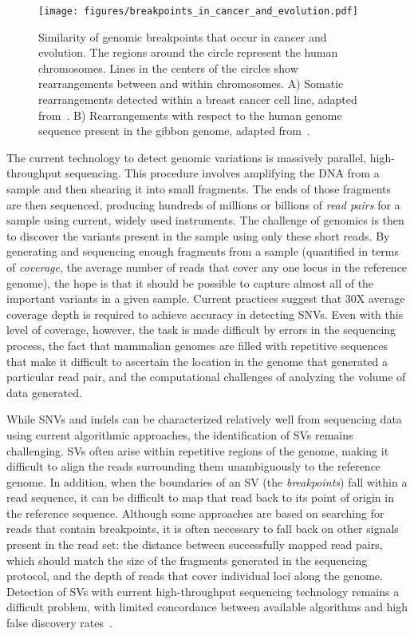 \begin{figure}
\centering
\texttt{[image: figures/breakpoints\_in\_cancer\_and\_evolution.pdf]}
\caption{Similarity of genomic breakpoints that occur in cancer and evolution. The regions around the circle represent the human chromosomes. Lines in the centers of the circles show rearrangements between and within chromosomes. A) Somatic rearrangements detected within a breast cancer cell line, adapted from~\cite{Hampton:2009fc}. B) Rearrangements with respect to the human genome sequence present in the gibbon genome, adapted from~\cite{Carbone:2009p1012}.}
\label{cancer_evolution_breakpoints}
\end{figure}

The current technology to detect genomic variations is massively parallel, high-throughput sequencing. This procedure involves amplifying the DNA from a sample and then shearing it into small fragments. The ends of those fragments are then sequenced, producing hundreds of millions or billions of \emph{read pairs} for a sample using current, widely used instruments. The challenge of genomics is then to discover the variants present in the sample using only these short reads. By generating and sequencing enough fragments from a sample (quantified in terms of \emph{coverage}, the average number of reads that cover any one locus in the reference genome), the hope is that it should be possible to capture almost all of the important variants in a given sample. Current practices suggest that 30X average coverage depth is required to achieve accuracy in detecting SNVs. Even with this level of coverage, however, the task is made difficult by errors in the sequencing process, the fact that mammalian genomes are filled with repetitive sequences that make it difficult to ascertain the location in the genome that generated a particular read pair, and the computational challenges of analyzing the volume of data generated.

While SNVs and indels can be characterized relatively well from sequencing data using current algorithmic approaches, the identification of SVs remains challenging. SVs often arise within repetitive regions of the genome, making it difficult to align the reads surrounding them unambiguously to the reference genome. In addition, when the boundaries of an SV (the \emph{breakpoints}) fall within a read sequence, it can be difficult to map that read back to its point of origin in the reference sequence. Although some approaches are based on searching for reads that contain breakpoints, it is often necessary to fall back on other signals present in the read set: the distance between successfully mapped read pairs, which should match the size of the fragments generated in the sequencing protocol, and the depth of reads that cover individual loci along the genome. Detection of SVs with current high-throughput sequencing technology remains a difficult problem, with limited concordance between available algorithms and high false discovery rates~\cite{Mills:2011p1611}.

